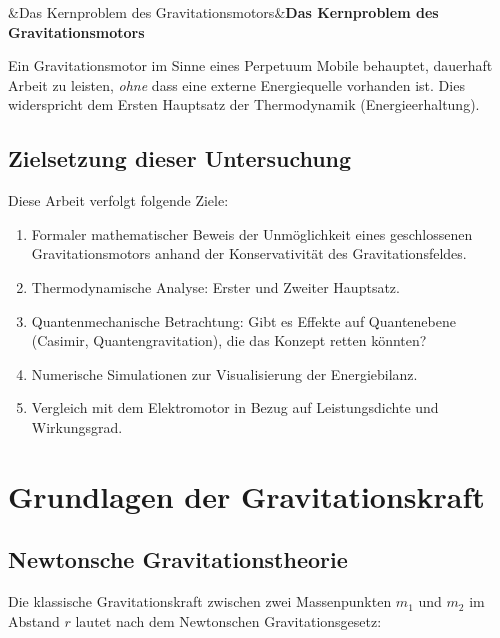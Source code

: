 ﻿\documentclass[12pt, a4paper]{report}
\newenvironment{wichtig}[1][]{%
  \begin{wichtigframe}\sloppy%
  \ifx&#1&\else\textbf{#1}\par\smallskip\fi}{\end{wichtigframe}}
\theoremstyle{definition}
\theoremstyle{remark}
\begin{document}
\begin{wichtig}[Das Kernproblem des Gravitationsmotors]
  Ein Gravitationsmotor im Sinne eines Perpetuum Mobile behauptet, dauerhaft
  Arbeit zu leisten, \emph{ohne} dass eine externe Energiequelle vorhanden ist.
  Dies widerspricht dem Ersten Hauptsatz der Thermodynamik (Energieerhaltung).
\end{wichtig}

\section{Zielsetzung dieser Untersuchung}

Diese Arbeit verfolgt folgende Ziele:
\begin{enumerate}[leftmargin=2em]
  \item Formaler mathematischer Beweis der Unmöglichkeit eines geschlossenen
        Gravitationsmotors anhand der Konservativität des Gravitationsfeldes.
  \item Thermodynamische Analyse: Erster und Zweiter Hauptsatz.
  \item Quantenmechanische Betrachtung: Gibt es Effekte auf Quantenebene
        (Casimir, Quantengravitation), die das Konzept retten könnten?
  \item Numerische Simulationen zur Visualisierung der Energiebilanz.
  \item Vergleich mit dem Elektromotor in Bezug auf Leistungsdichte und Wirkungsgrad.
\end{enumerate}

\chapter{Grundlagen der Gravitationskraft}
\label{sec:grundlagen}

\section{Newtonsche Gravitationstheorie}

Die klassische Gravitationskraft zwischen zwei Massenpunkten $m_1$ und $m_2$ im
Abstand $r$ lautet nach dem Newtonschen Gravitationsgesetz:
\end{document}

